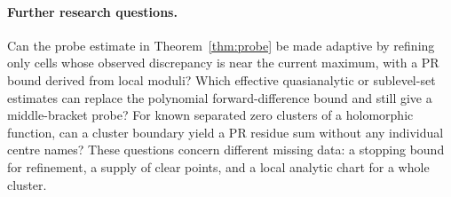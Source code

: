 \paragraph{Further research questions.}
Can the probe estimate in Theorem~\ref{thm:probe} be made adaptive by refining only cells whose observed discrepancy is near the current maximum, with a PR bound derived from local moduli? Which effective quasianalytic or sublevel-set estimates can replace the polynomial forward-difference bound and still give a middle-bracket probe? For known separated zero clusters of a holomorphic function, can a cluster boundary yield a PR residue sum without any individual centre names? These questions concern different missing data: a stopping bound for refinement, a supply of clear points, and a local analytic chart for a whole cluster.
